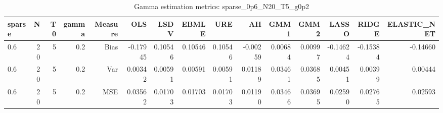 \begin{table}[!htbp]\centering
\caption{Gamma estimation metrics: sparse_0p6_N20_T5_g0p2}
\label{tab:table1_sparse_0p6_N20_T5_g0p2}
\begin{tabular}{lrrrrrrrrrrrrrr}
\hline
sparse & N & T0 & gamma & Measure & OLS & LSDV & EBMLE & URE & AH & GMM1 & GMM2 & LASSO & RIDGE & ELASTIC_NET \\
\hline
0.6 & 20 & 5 & 0.2 & Bias & -0.17945 & 0.10546 & 0.10546 & 0.10546 & -0.00259 & 0.00684 & 0.00997 & -0.14624 & -0.15384 & -0.14660 \\
0.6 & 20 & 5 & 0.2 & Var & 0.00342 & 0.00591 & 0.00591 & 0.00591 & 0.01189 & 0.03461 & 0.03685 & 0.00451 & 0.00399 & 0.00444 \\
0.6 & 20 & 5 & 0.2 & MSE & 0.03562 & 0.01703 & 0.01703 & 0.01703 & 0.01190 & 0.03466 & 0.03695 & 0.02590 & 0.02765 & 0.02593 \\
\hline
\end{tabular}
\end{table}

